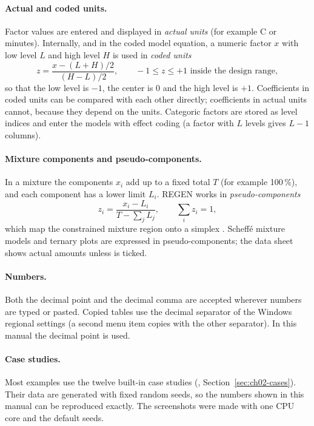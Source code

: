 \paragraph{Actual and coded units.} Factor values are entered and displayed in \emph{actual units} (for example
\textdegree C or minutes). Internally, and in the coded model equation, a numeric factor $x$ with low level $L$ and
high level $H$ is used in \emph{coded units}
\begin{equation}
  z = \frac{x-(L+H)/2}{(H-L)/2}, \qquad -1 \le z \le +1 \text{ inside the design range},
  \label{eq:ch01-coded}
\end{equation}
so that the low level is $-1$, the center is 0 and the high level is $+1$. Coefficients in coded units can be
compared with each other directly; coefficients in actual units cannot, because they depend on the units.
Categoric factors are stored as level indices and enter the models with effect coding (a factor with $L$ levels
gives $L-1$ columns).

\paragraph{Mixture components and pseudo-components.} In a mixture the components $x_i$ add up to a fixed total $T$
(for example 100\,\%), and each component has a lower limit $L_i$. REGEN works in \emph{pseudo-components}
\begin{equation}
  z_i = \frac{x_i - L_i}{T - \sum_j L_j}, \qquad \sum_i z_i = 1,
  \label{eq:ch01-pseudo}
\end{equation}
which map the constrained mixture region onto a simplex \citep{cornell2002,piepel1982}. Scheff\'e mixture
models \citep{scheffe1958} and ternary plots are expressed in pseudo-components; the data sheet shows actual amounts
unless  is ticked.

\paragraph{Numbers.} Both the decimal point and the decimal comma are accepted wherever numbers are typed or pasted.
Copied tables use the decimal separator of the Windows regional settings (a second menu item copies with the other
separator). In this manual the decimal point is used.

\paragraph{Case studies.} Most examples use the twelve built-in case studies (, Section~\ref{sec:ch02-cases}). Their data are generated with fixed random seeds, so the numbers shown
in this manual can be reproduced exactly. The screenshots were made with one CPU core and the default seeds.

